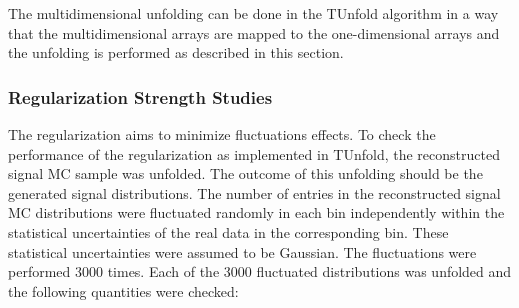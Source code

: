 The multidimensional unfolding can be done in the TUnfold algorithm in a way that the multidimensional arrays are mapped to the one-dimensional
arrays and the unfolding is performed as described in this section.

\subsubsection{Regularization Strength Studies}

The regularization aims to minimize fluctuations effects. To check the performance of the regularization as implemented in TUnfold, the reconstructed signal
MC sample was unfolded. The outcome of this unfolding should be the generated signal distributions. The number of entries in the reconstructed signal
MC distributions were fluctuated randomly in each bin independently within the statistical uncertainties of the real data in the corresponding bin. 
These statistical uncertainties were assumed to be Gaussian. The fluctuations were performed 3000 times. Each of the 3000 fluctuated distributions 
was unfolded and the following quantities were checked:

